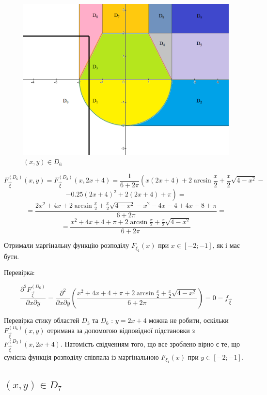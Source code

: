 \documentclass[14pt, a4paper, ukrainian]{extreport}
\begin{document}
	\begin{figure}[H]
		\centering
		\includegraphics[width=\textwidth]{./Image/Im_17_D_6.png}
		\caption{$(x, y) \in D_6$}
		\label{im:D_6}
	\end{figure}
	
	$$ F_{\vec \xi}^{\left(D_6\right)}(x, y) = F_{\vec \xi}^{\left(D_3\right)}(x, 2x + 4) = \frac{1}{6+2\pi}\left(x(2x+4) + 2\arcsin\frac{x}{2} + \frac{x}{2}\sqrt{4-x^2} - \right.
	$$
	$$ \left.- 0.25(2x+4)^2 + 2(2x+4) + \pi \right) = 
	$$
	$$ = \frac{2x^2 +4x + 2\arcsin\frac{x}{2} + \frac{x}{2}\sqrt{4-x^2} - x^2 - 4x -4 + 4x +8 + \pi}{6+2\pi} = 
	$$
	$$ = \frac{x^2 +4x +4 +\pi + 2\arcsin\frac{x}{2} + \frac{x}{2}\sqrt{4-x^2}}{6+2\pi} 
	$$
	
	Отримали маргінальну функцію розподілу $ F_{\xi_1} (x) $ при $x \in [-2; -1]$, як і має бути.
	
	Перевірка:
	
	$$\frac{\partial^2F_{\vec\xi}^{\left(D_6\right)}}{\partial x \partial y} = \frac{\partial^2}{\partial x \partial y} \left(\frac{x^2 +4x +4 +\pi + 2\arcsin\frac{x}{2} + \frac{x}{2}\sqrt{4-x^2}}{6+2\pi} \right) = 0 = f_{\vec\xi}
	$$
	
	Перевірка стику областей $D_3$ та $D_6$ : $ y = 2x + 4$ можна не робити, оскільки $F_{\vec \xi}^{\left(D_6\right)}(x, y)$ отримана за допомогою відповідної підстановки з \\
	$F_{\vec \xi}^{\left(D_3\right)}(x, 2x + 4)$. Натомість свідченням того, що все зроблено вірно є те, що сумісна функція розподілу співпала із маргінальною $ F_{\xi_1} (x) $ при $y \in [-2; -1]$.
	
	\subsection{$(x, y) \in D_7$}
	
\end{document}
